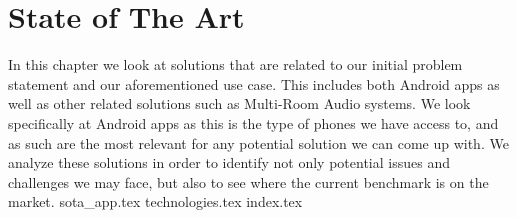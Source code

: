 \chapter{State of The Art}\label{cha:sota}
In this chapter we look at solutions that are related to our initial problem statement and our aforementioned use case.
This includes both Android apps as well as other related solutions such as Multi-Room Audio systems.
We look specifically at Android apps as this is the type of phones we have access to, and as such are the most relevant for any potential solution we can come up with.
We analyze these solutions in order to identify not only potential issues and challenges we may face, but also to see where the current benchmark is on the market.
{sota_app.tex}
{technologies.tex}
{index.tex}
